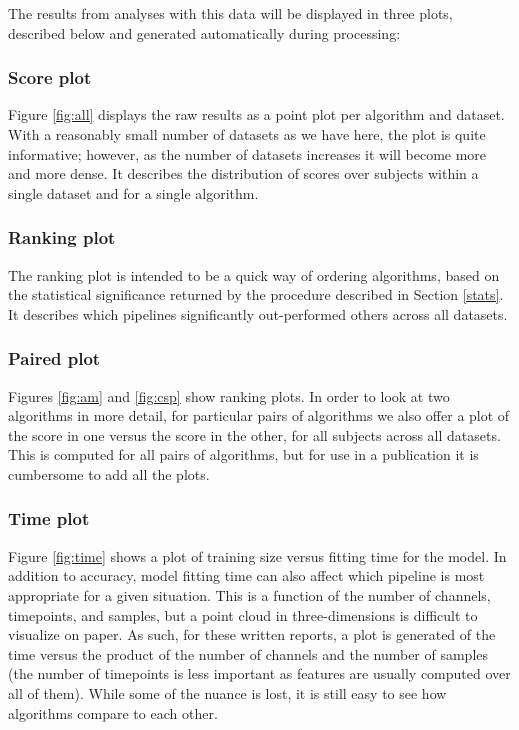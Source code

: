 The results from analyses with this data will be displayed in three
plots, described below and generated automatically during processing:

\subsubsection{Score plot}
Figure \ref{fig:all} displays the raw results as a point plot per algorithm and
dataset. With a reasonably small number of datasets as we have here, the plot is
quite informative; however, as the number of datasets increases it will become
more and more dense. It describes the distribution of scores over subjects
within a single dataset and for a single algorithm.

\subsubsection{Ranking plot}
The ranking
plot is intended to be a quick way of ordering algorithms, based on
the statistical significance returned by the procedure described in
Section \ref{stats}. It describes which pipelines significantly
out-performed others across all datasets.

\subsubsection{Paired plot}
Figures \ref{fig:am} and \ref{fig:csp} show ranking plots. In order to
look at two algorithms in more detail, for particular pairs of
algorithms we also offer a plot of the score in one versus the score in the other,
for all subjects across all datasets. This is computed for all pairs
of algorithms, but for use in a publication it is cumbersome to add
all the plots.

\subsubsection{Time plot}
Figure \ref{fig:time} shows a plot of training size versus fitting
time for the model. In addition to accuracy, model fitting time can also affect which
pipeline is most appropriate for a given situation. This is a function
of the number of channels, timepoints, and samples, but a point
cloud in three-dimensions is difficult to visualize on paper. As such,
for these written reports, a plot is generated of the time versus the product of the
number of channels and the number of samples (the number of timepoints
is less important as features are usually computed over all of
them). While some of the nuance is lost, it is still easy to see how
algorithms compare to each other.

